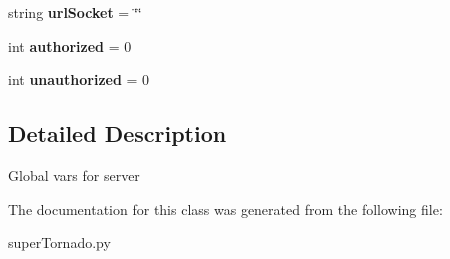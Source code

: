 \begin{DoxyCompactItemize}
\item 
\hypertarget{classsuper_tornado_1_1_global_vars_a198024d11aabe49f4cced6f8c92f2557}{string {\bfseries url\-Socket} = \char`\"{}\char`\"{}}\label{classsuper_tornado_1_1_global_vars_a198024d11aabe49f4cced6f8c92f2557}

\item 
\hypertarget{classsuper_tornado_1_1_global_vars_a53190e11b952863f655e2a8637b4d9b0}{int {\bfseries authorized} = 0}\label{classsuper_tornado_1_1_global_vars_a53190e11b952863f655e2a8637b4d9b0}

\item 
\hypertarget{classsuper_tornado_1_1_global_vars_ace59d34b127bace56dd6db537a5134a1}{int {\bfseries unauthorized} = 0}\label{classsuper_tornado_1_1_global_vars_ace59d34b127bace56dd6db537a5134a1}

\end{DoxyCompactItemize}


\subsection{Detailed Description}
\begin{DoxyVerb}Global vars for server\end{DoxyVerb}
 

The documentation for this class was generated from the following file\-:\begin{DoxyCompactItemize}
\item 
super\-Tornado.\-py\end{DoxyCompactItemize}
